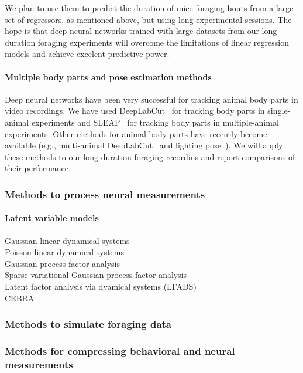 We plan to use them to predict the duration of mice foraging bouts from a
large set of regressors, as mentioned above, but using long experimental
sessions. The hope is that deep neural networks trained with large datasets
from our long-duration foraging experiments will overcome the limitations of
linear regression models and achieve excelent predictive power.

\paragraph{Multiple body parts and pose estimation methods}

Deep neural networks have been very successful for tracking animal body parts
in video recordings.
%
We have used DeepLabCut~\citep{mathisEtAl18} for tracking body parts in
single-animal experiments and SLEAP~\citep{pereriraEtAl22} for tracking body
parts in multiple-animal experiments. Other methods for animal body parts have
recently become available (e.g., multi-animal DeepLabCut~\citep{lauerEtAl22}
and lighting pose~\citep{bidermanEtAl23}).
%
We will apply these methods to our long-duration foraging recordins and report
comparisons of their performance.

\subsubsection{Methods to process neural measurements}

\paragraph{Latent variable models}

\begin{description}

    \item[Gaussian linear dynamical systems]

    \item[Poisson linear dynamical systems]

    \item[Gaussian process factor analysis]

    \item[Sparse variational Gaussian process factor analysis]

    \item[Latent factor analysis via dyamical systems (LFADS)]

    \item[CEBRA]

\end{description}

\subsubsection{Methods to simulate foraging data}

\subsubsection{Methods for compressing behavioral and neural measurements}

